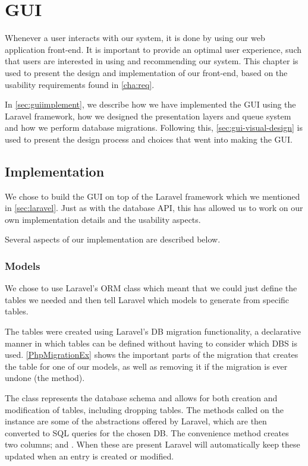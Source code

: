 \chapter{GUI} \label{GUI}
Whenever a user interacts with our system, it is done by using our
web application front-end. It is important to provide an optimal user
experience, such that users are interested in using and recommending our
system. This chapter is used to present the design and implementation of our
front-end, based on the usability requirements found in \autoref{cha:req}.\nl

In \autoref{sec:guiimplement}, we describe how we have implemented the GUI using
the Laravel framework, how we designed the presentation layers and queue system
and how we perform database migrations. Following this,
\autoref{sec:gui-visual-design} is used to present the design process and
choices that went into making the \ac{GUI}.


\section{Implementation}\label{sec:guiimplement}
We chose to build the \ac{GUI} on top of the Laravel framework which we
mentioned in \autoref{sec:laravel}. Just as with the database \ac{API}, this has
allowed us to work on our own implementation details and the usability aspects.\nl

Several aspects of our implementation are described below.

\subsection{Models}
We chose to use Laravel's \ac{ORM} class which meant that we could just define
the tables we needed and then tell Laravel which models to generate from
specific tables.\nl

The tables were created using Laravel's \ac{DB} migration functionality, a
declarative manner in which tables can be defined without having to consider
which \ac{DBS} is used. \autoref{PhpMigrationEx} shows the important parts of
the migration that creates the table for one of our models, as well as removing
it if the migration is ever undone (the  method).\nl

The  class represents the database schema and allows for both
creation and modification of tables, including dropping tables. The methods
called on the  instance  are some of the
abstractions offered by Laravel, which are then converted to \ac{SQL} queries
for the chosen \ac{DB}. The convenience method  creates two
columns;  and . When these are present Laravel
will automatically keep these updated when an entry is created or modified.\nl

